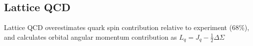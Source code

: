 \subsection{Lattice QCD}

Lattice QCD overestimates quark spin contribution relative to experiment
(68\%), and calculates orbital angular momentum contribution as $L_q = J_q -
\frac{1}{2}\Delta \Sigma$
